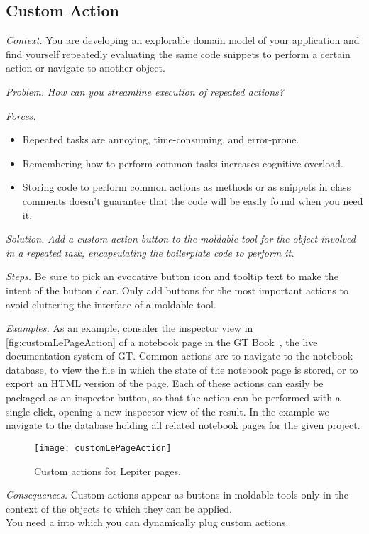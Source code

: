 \documentclass[acmsmall,screen,authorversion,nonacm]{acmart} %
\newcommand\cp[1]{\nbe{Cesare}{#1}{olive}} %
\newcommand{\pattern}[2]{\needlines{10}
\subsection*{#1}\label{pat:#2}}
\newcommand{\patref}[1]{\emph{\nameref{pat:#1}}\xspace}
\newcommand{\patsec}[1]{\noindent\textit{#1.}\xspace}
\begin{document}
\pattern{Custom Action}{CustomAction}
\patsec{Context}
You are developing an explorable domain model of your application and find yourself repeatedly evaluating the same code snippets to perform a certain action or navigate to another object.

\patsec{Problem}
\emph{How can you streamline execution of repeated actions?}

\patsec{Forces}
\begin{itemize}[---]
\item Repeated tasks are annoying, time-consuming, and error-prone.
\item Remembering how to perform common tasks increases cognitive overload.
\item Storing code to perform common actions as methods or as snippets in class comments doesn't guarantee that the code will be easily found when you need it.
\end{itemize}

\patsec{Solution}
\emph{Add a custom action button to the moldable tool for the object involved in a repeated task, encapsulating the boilerplate code to perform it.}

\patsec{Steps}
Be sure to pick an evocative button icon and tooltip text to make the intent of the button clear.
Only add buttons for the most important actions to avoid cluttering the interface of a moldable tool.

\patsec{Examples}
As an example, consider the inspector view in \autoref{fig:customLePageAction} of a notebook page in the GT Book~\cite{Girb21a}, the live documentation system of GT.
Common actions are to navigate to the notebook database, to view the file in which the state of the notebook page is stored, or to export an HTML version of the page.
Each of these actions can easily be packaged as an inspector button, so that the action can be performed with a single click, opening a new inspector view of the result.
In the example we navigate to the database holding all related notebook pages for the given project.

\begin{figure}[h]
  \texttt{[image: customLePageAction]}
  \caption{Custom actions for Lepiter pages.}
  \label{fig:customLePageAction}
\end{figure}

\patsec{Consequences}
Custom actions appear as buttons in moldable tools only in the context of the objects to which they can be applied.\\
You need a \patref{MoldableTool} into which you can dynamically plug custom actions.
\end{document}
